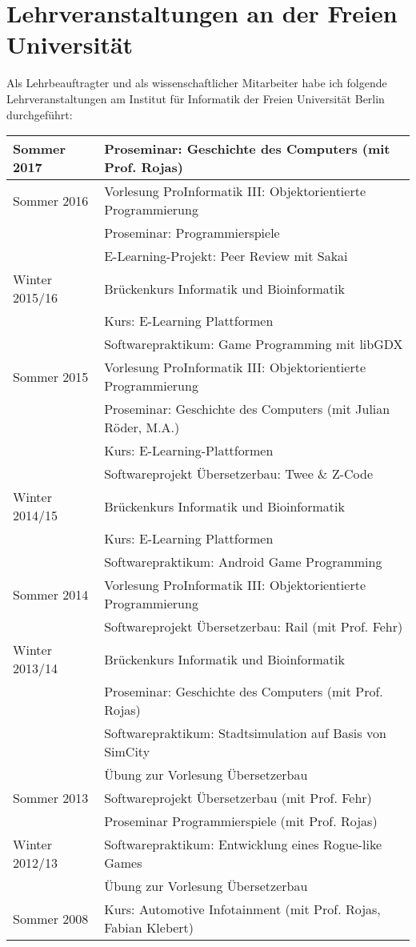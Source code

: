 \documentclass[11pt,ngerman]{article}
\begin{document}
\pagebreak

\section{Lehrveranstaltungen an der Freien Universität}

Als Lehrbeauftragter und als wissenschaftlicher Mitarbeiter habe ich folgende Lehrveranstaltungen am Institut für Informatik der Freien Universität Berlin durchgeführt:\\

\begin{tabular}{ l | l }
  Sommer 2017 & Proseminar: Geschichte des Computers (mit Prof. Rojas)\\
  \hline
  Sommer 2016 & Vorlesung ProInformatik III: Objektorientierte Programmierung\\[-2mm]
  & Proseminar: Programmierspiele\\[-2mm]
  & E-Learning-Projekt: Peer Review mit Sakai\\
  \hline  
Winter 2015/16 & Brückenkurs Informatik und Bioinformatik\\[-2mm]
& Kurs: E-Learning Plattformen\\[-2mm]
& Softwarepraktikum: Game Programming mit libGDX\\
 \hline			
Sommer 2015 & Vorlesung ProInformatik III: Objektorientierte Programmierung\\[-2mm]
& Proseminar: Geschichte des Computers (mit Julian Röder, M.A.)\\[-2mm]
& Kurs: E-Learning-Plattformen\\[-2mm]
& Softwareprojekt Übersetzerbau: Twee \& Z-Code\\
  \hline
Winter 2014/15 & Brückenkurs Informatik und Bioinformatik\\[-2mm]
& Kurs: E-Learning Plattformen\\[-2mm]
& Softwarepraktikum: Android Game Programming\\
  \hline
Sommer 2014 & Vorlesung ProInformatik III: Objektorientierte Programmierung\\[-2mm]
& Softwareprojekt Übersetzerbau: Rail (mit Prof. Fehr)\\
  \hline
Winter 2013/14 & Brückenkurs Informatik und Bioinformatik\\[-2mm]
& Proseminar: Geschichte des Computers (mit Prof. Rojas)\\[-2mm]
& Softwarepraktikum: Stadtsimulation auf Basis von SimCity\\[-2mm]
& Übung zur Vorlesung Übersetzerbau\\
  \hline
Sommer 2013 & Softwareprojekt Übersetzerbau (mit Prof. Fehr)\\[-2mm]
& Proseminar Programmierspiele (mit Prof. Rojas)\\
  \hline
Winter 2012/13 & Softwarepraktikum: Entwicklung eines Rogue-like Games\\[-2mm]
& Übung zur Vorlesung Übersetzerbau\\
  \hline
Sommer 2008 & Kurs: Automotive Infotainment (mit Prof. Rojas, Fabian Klebert)\\
\end{tabular}
\end{document}
